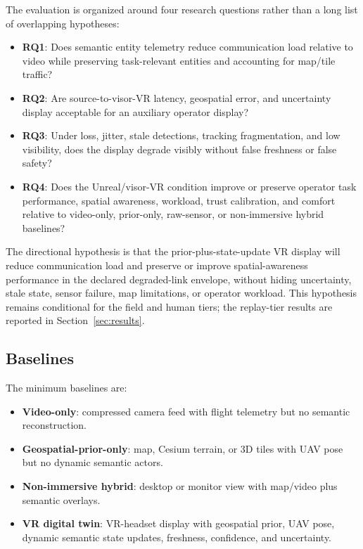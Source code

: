 \documentclass[fleqn]{VRIH2025}
\begin{document}
The evaluation is organized around four research questions rather than a long list of overlapping hypotheses:

\begin{itemize}
    \item \textbf{RQ1}: Does semantic entity telemetry reduce communication load relative to video while preserving task-relevant entities and accounting for map/tile traffic?
    \item \textbf{RQ2}: Are source-to-visor-VR latency, geospatial error, and uncertainty display acceptable for an auxiliary operator display?
    \item \textbf{RQ3}: Under loss, jitter, stale detections, tracking fragmentation, and low visibility, does the display degrade visibly without false freshness or false safety?
    \item \textbf{RQ4}: Does the Unreal/visor-VR condition improve or preserve operator task performance, spatial awareness, workload, trust calibration, and comfort relative to video-only, prior-only, raw-sensor, or non-immersive hybrid baselines?
\end{itemize}

The directional hypothesis is that the prior-plus-state-update VR display will reduce communication load and preserve or improve spatial-awareness performance in the declared degraded-link envelope, without hiding uncertainty, stale state, sensor failure, map limitations, or operator workload. This hypothesis remains conditional for the field and human tiers; the replay-tier results are reported in Section~\ref{sec:results}.

\subsection{Baselines}

The minimum baselines are:

\begin{itemize}
    \item \textbf{Video-only}: compressed camera feed with flight telemetry but no semantic reconstruction.
    \item \textbf{Geospatial-prior-only}: map, Cesium terrain, or 3D tiles with UAV pose but no dynamic semantic actors.
    \item \textbf{Non-immersive hybrid}: desktop or monitor view with map/video plus semantic overlays.
    \item \textbf{VR digital twin}: VR-headset display with geospatial prior, UAV pose, dynamic semantic state updates, freshness, confidence, and uncertainty.
\end{itemize}
\end{document}
